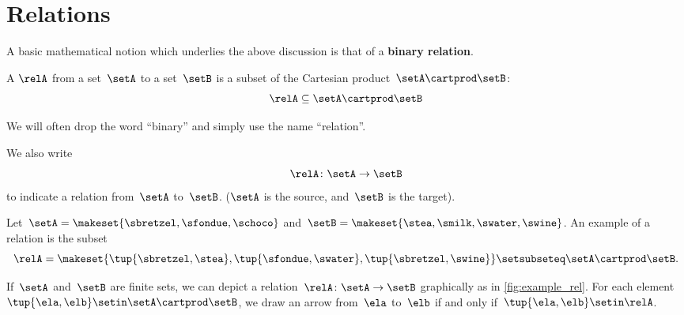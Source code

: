 
\section{Relations}
\label{sec:connection-relations}

A basic mathematical notion which underlies the above discussion is that of a \textbf{binary relation}.

\begin{ctdefinition}
    \label{def:binary-relation}
    A \emph{} $\relA$ from a set~$\setA$ to a set~$\setB$ is a subset of the Cartesian product~$\setA\cartprod \setB$:
    \begin{equation}
        \relA \subseteq \setA \cartprod \setB
    \end{equation}
\end{ctdefinition}

We will often drop the word ``binary'' and simply use the name ``relation''.

We also write
\begin{equation}
    \relA \colon \setA \to \setB
\end{equation}
to indicate a relation from~$\setA$ to~$\setB$.
($\setA$ is the source, and~$\setB$ is the target).

\begin{marginfigure}
    \centering
    \caption{}
    \label{fig:example_rel}
\end{marginfigure}

\begin{example}
    \label{exa:simple-rel}
    Let~$\setA = \makeset{ \sbretzel, \sfondue, \schoco}$ and~$\setB = \makeset{ \stea, \smilk, \swater, \swine }$.
    An example of a relation is the subset
    \begin{equation}
        \relA = \makeset{ \tup{\sbretzel, \stea}, \tup{\sfondue, \swater}, \tup{\sbretzel, \swine} } \setsubseteq \setA \cartprod \setB.
    \end{equation}
\end{example}

If~$\setA$ and~$\setB$ are finite sets, we can depict a relation~$\relA \colon \setA \to \setB$ graphically as in \cref{fig:example_rel}.
For each element~$\tup{\ela,\elb} \setin \setA \cartprod \setB$, we draw an arrow from~$\ela$ to~$\elb$ if and only if~$\tup{\ela,\elb} \setin \relA$.

